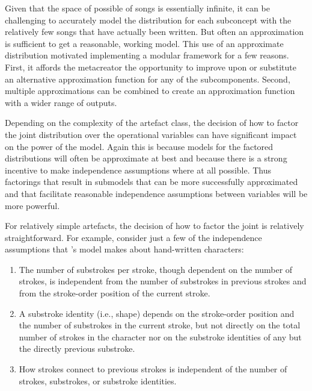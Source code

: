 \documentclass[letterpaper]{article}
\begin{document}
Given that the space of possible of songs is essentially infinite, it can be challenging to accurately model the distribution for each subconcept with the relatively few songs that have actually been written. But often an approximation is sufficient to get a reasonable, working model. This use of an approximate distribution motivated implementing a modular framework for a few reasons. First, it affords the metacreator the opportunity to improve upon or substitute an alternative approximation function for any of the subcomponents. Second, multiple approximations can be combined to create an approximation function with a wider range of outputs.

Depending on the complexity of the artefact class, the decision of how to factor the joint distribution over the operational variables can have significant impact on the power of the model. Again this is because models for the factored distributions will often be approximate at best and because there is a strong incentive to make independence assumptions where at all possible. Thus factorings that result in submodels that can be more successfully approximated and that facilitate reasonable independence assumptions between variables will be more powerful.

For relatively simple artefacts, the decision of how to factor the joint is relatively straightforward. For example, consider just a few of the independence assumptions that \cite{lake2015human}'s model makes about hand-written characters:

\begin{enumerate}  
\item The number of substrokes per stroke, though dependent on the number of strokes, is independent from the number of substrokes in previous strokes and from the stroke-order position of the current stroke.
\item A substroke identity (i.e., shape) depends on the stroke-order position and the number of substrokes in the current stroke, but not directly on the total number of strokes in the character nor on the substroke identities of any but the directly previous substroke.
\item How strokes connect to previous strokes is independent of the number of strokes, substrokes, or substroke identities.
\end{enumerate}
\end{document}
